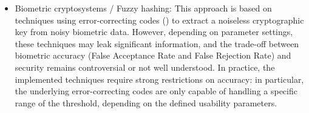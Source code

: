 \begin{itemize}
\item Biometric cryptosystems / Fuzzy hashing: This approach is based on techniques using error-correcting codes (\cite{uludag2004biometric, nagar2010hybrid}) to extract a noiseless cryptographic key from noisy biometric data. However, depending on parameter settings, these techniques may leak significant information, and the trade-off between biometric accuracy (False Acceptance Rate and False Rejection Rate) and security remains controversial or not well understood. In practice, the implemented techniques require strong restrictions on accuracy: in particular, the underlying error-correcting codes are only capable of handling a specific range of the threshold, depending on the defined usability parameters.


\end{itemize}
